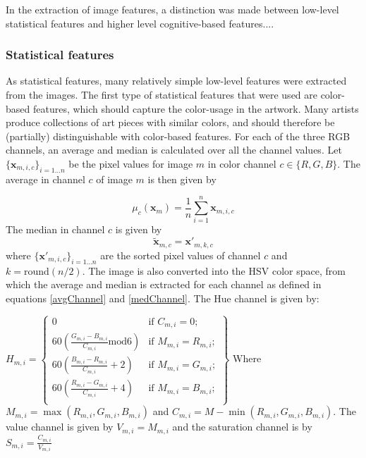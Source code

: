 In the extraction of image features, a distinction was made between low-level statistical features and higher level cognitive-based features....

\subsubsection{Statistical features}
As statistical features, many relatively simple low-level features were extracted from the images.
The first type of statistical features that were used are color-based features, which should capture the color-usage in the artwork. Many artists produce collections of art pieces with similar colors, and should therefore be (partially) distinguishable with color-based features. For each of the three RGB channels, an average and median is calculated over all the channel values. Let $\{\mathbf{x}_{m,i,c} \}_{i=1\dots n}$ be the pixel values for image $m$ in color channel $c \in \{R,G,B \}$. The average in channel $c$ of image $m$ is then given by 

\begin{equation}
\label{avgChannel}
\mu_c(\mathbf{x}_{m}) = \frac{1}{n}\sum_{i=1}^{n} \mathbf{x}_{m,i,c} 
\end{equation}
The median in channel $c$ is given by 
\begin{equation}
\label{medChannel}
\tilde{\mathbf{x}}_{m,c} = \mathbf{x'}_{m,k,c}
\end{equation}
where $\{\mathbf{x'}_{m,i,c}\}_{i = 1\dots n}$ are the sorted pixel values of channel $c$ and $k = \mbox{round}(n/2)$.
The image is also converted into the HSV color space, from which the average and median is extracted for each channel as defined in equations \ref{avgChannel} and \ref{medChannel}. The Hue channel is given by: 

$H_{m,i} = \left\{ 
\begin{array}{ll}
0 & \mbox{if $C_{m,i} = 0$};\\
60 \left(\frac{G_{m,i}-B_{m,i}}{C_{m,i}} \mbox{mod} 6 \right) & \mbox{if $M_{m,i} = R_{m,i}$};\\
60 \left(\frac{B_{m,i}-R_{m,i}}{C_{m,i}} + 2 \right) & \mbox{if $M_{m,i} = G_{m,i}$};\\
60 \left(\frac{R_{m,i}-G_{m,i}}{C_{m,i}} + 4 \right) & \mbox{if $M_{m,i} = B_{m,i}$}; \\
\end{array} 
\right\}$
Where $M_{m,i} = \max(R_{m,i},G_{m,i},B_{m,i})$ and $C_{m,i} =  M - \min(R_{m,i},G_{m,i},B_{m,i})$. The value channel is given by $V_{m,i} =  M_{m,i}$ and the saturation channel is  by $S_{m,i} = \frac{C_{m,i}}{V_{m,i}}$

